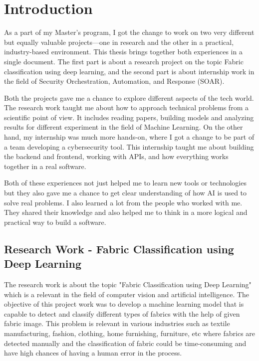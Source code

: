 \chapter{Introduction}

As a part of my Master’s program, I got the change to work on two very different but equally valuable projects—one in research and the other in a practical, industry-based environment. This thesis brings together both experiences in a single document. The first part is about a research project on the topic Fabric classification using deep learning, and the second part is about internship work in the field of Security Orchestration, Automation, and Response (SOAR).

Both the projects gave me a chance to explore different aspects of the tech world. The research work taught me about how to approach technical problems from a scientific point of view. It includes reading papers, building models and analyzing results for different experiment in the field of Machine Learning. On the other hand, my internship was much more hands-on, where I got a change to be part of a team developing a cybersecurity tool. This internship taught me about building the backend and frontend, working with APIs, and how everything works together in a real software.

Both of these experiences not just helped me to learn new tools or technologies but they also gave me a chance to get clear understanding of how AI is used to solve real problems. I also learned a lot from the people who worked with me. They shared their knowledge and also helped me to think in a more logical and practical way to build a software.

\section{Research Work - Fabric Classification using Deep Learning}

The research work is about the topic "Fabric Classification using Deep Learning" which is a relevant  in the field of computer vision and artificial intelligence. The objective of this project work was to develop a machine learning model that is capable to detect and classify different types of fabrics with the help of given fabric image. This problem is relevant in various industries such as textile manufacturing, fashion, clothing, home furnishing, furniture, etc where fabrics are detected manually and the classification of fabric could be time-consuming and have high chances of having a human error in the process.

